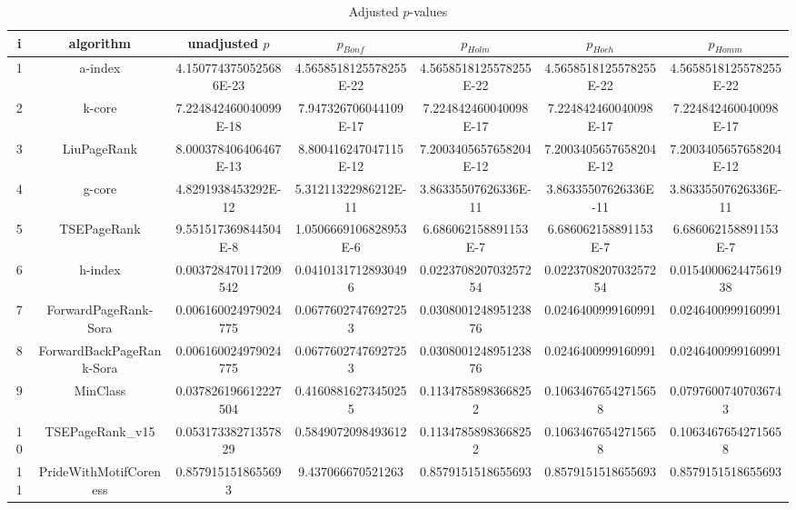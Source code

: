 \documentclass[a4paper,10pt]{article}
\begin{document}
\begin{landscape}
\begin{table}[!htp]
\centering\tiny
\caption{Adjusted $p$-values}
\begin{tabular}{ccccccc}
i&algorithm&unadjusted $p$&$p_{Bonf}$&$p_{Holm}$&$p_{Hoch}$&$p_{Homm}$\\
\hline
1&a-index&4.1507743750525686E-23&4.5658518125578255E-22&4.5658518125578255E-22&4.5658518125578255E-22&4.5658518125578255E-22\\
2&k-core&7.224842460040099E-18&7.947326706044109E-17&7.224842460040098E-17&7.224842460040098E-17&7.224842460040098E-17\\
3&LiuPageRank&8.000378406406467E-13&8.800416247047115E-12&7.2003405657658204E-12&7.2003405657658204E-12&7.2003405657658204E-12\\
4&g-core&4.8291938453292E-12&5.31211322986212E-11&3.86335507626336E-11&3.86335507626336E-11&3.86335507626336E-11\\
5&TSEPageRank&9.551517369844504E-8&1.0506669106828953E-6&6.686062158891153E-7&6.686062158891153E-7&6.686062158891153E-7\\
6&h-index&0.003728470117209542&0.04101317128930496&0.022370820703257254&0.022370820703257254&0.015400062447561938\\
7&ForwardPageRank-Sora&0.006160024979024775&0.06776027476927253&0.030800124895123876&0.0246400999160991&0.0246400999160991\\
8&ForwardBackPageRank-Sora&0.006160024979024775&0.06776027476927253&0.030800124895123876&0.0246400999160991&0.0246400999160991\\
9&MinClass&0.037826196612227504&0.41608816273450255&0.11347858983668252&0.10634676542715658&0.07976007407036743\\
10&TSEPageRank_v15&0.05317338271357829&0.5849072098493612&0.11347858983668252&0.10634676542715658&0.10634676542715658\\
11&PrideWithMotifCoreness&0.8579151518655693&9.437066670521263&0.8579151518655693&0.8579151518655693&0.8579151518655693\\
\hline
\end{tabular}
\end{table}


\end{landscape}
\end{document}
